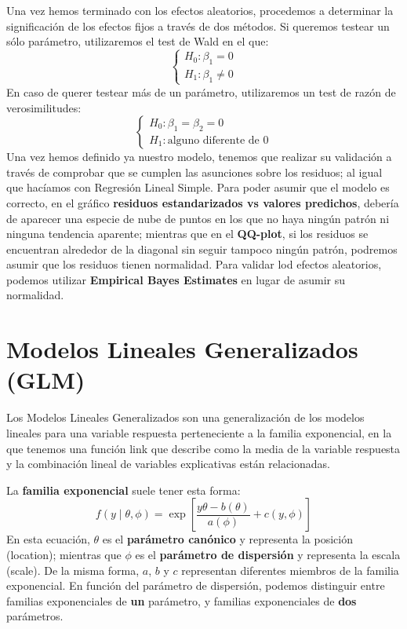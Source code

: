 \documentclass[
  letterpaper,
  DIV=11,
  numbers=noendperiod]{scrreprt}
\begin{document}
Una vez hemos terminado con los efectos aleatorios, procedemos a
determinar la significación de los efectos fijos a través de dos
métodos. Si queremos testear un sólo parámetro, utilizaremos el test de
Wald en el que: \[
\begin{cases}
H_0 : \beta_1 = 0 \\
H_1 : \beta_1 \neq 0
\end{cases}
\] En caso de querer testear más de un parámetro, utilizaremos un test
de razón de verosimilitudes: \[
\begin{cases}
H_0 : \beta_1 = \beta_2 = 0 \\
H_1 : \text{alguno diferente de 0}
\end{cases}
\] Una vez hemos definido ya nuestro modelo, tenemos que realizar su
validación a través de comprobar que se cumplen las asunciones sobre los
residuos; al igual que hacíamos con Regresión Lineal Simple. Para poder
asumir que el modelo es correcto, en el gráfico \textbf{residuos
estandarizados vs valores predichos}, debería de aparecer una especie de
nube de puntos en los que no haya ningún patrón ni ninguna tendencia
aparente; mientras que en el \textbf{QQ-plot}, si los residuos se
encuentran alrededor de la diagonal sin seguir tampoco ningún patrón,
podremos asumir que los residuos tienen normalidad. Para validar lod
efectos aleatorios, podemos utilizar \textbf{Empirical Bayes Estimates}
en lugar de asumir su normalidad.

\section{Modelos Lineales Generalizados
(GLM)}\label{modelos-lineales-generalizados-glm}

Los Modelos Lineales Generalizados son una generalización de los modelos
lineales para una variable respuesta perteneciente a la familia
exponencial, en la que tenemos una función link que describe como la
media de la variable respuesta y la combinación lineal de variables
explicativas están relacionadas.

La \textbf{familia exponencial} suele tener esta forma: \[
f(y \mid \theta, \phi) = \exp \left[ \frac{y\theta - b(\theta)}{a(\phi)} + c(y, \phi) \right]
\] En esta ecuación, \(\theta\) es el \textbf{parámetro canónico} y
representa la posición (location); mientras que \(\phi\) es el
\textbf{parámetro de dispersión} y representa la escala (scale). De la
misma forma, \(a\), \(b\) y \(c\) representan diferentes miembros de la
familia exponencial. En función del parámetro de dispersión, podemos
distinguir entre familias exponenciales de \textbf{un} parámetro, y
familias exponenciales de \textbf{dos} parámetros.
\end{document}
